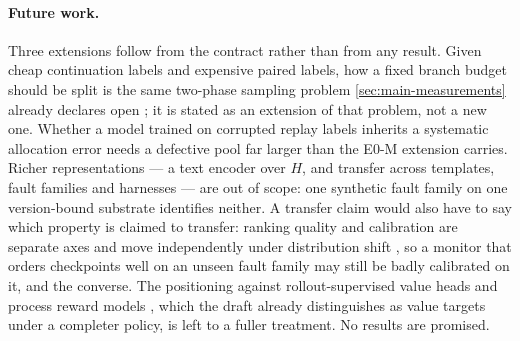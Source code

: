 \paragraph{Future work.}
Three extensions follow from the contract rather than from any result.  Given
cheap continuation labels and expensive paired labels, how a fixed branch budget
should be split is the same two-phase sampling problem
\cref{sec:main-measurements} already declares open
\citep{neyman1938,angelopoulos2023ppi}; it is stated as an extension of that
problem, not a new one.  Whether a model trained on corrupted replay labels
inherits a systematic allocation error needs a defective pool far larger than the
E0-M extension carries.  Richer representations --- a text encoder over $H$, and
transfer across templates, fault families and harnesses --- are out of scope: one
synthetic fault family on one version-bound substrate identifies neither.  A
transfer claim would also have to say which property is claimed to transfer:
ranking quality and calibration are separate axes and move independently under
distribution shift \citep{damani2025rlcr}, so a monitor that orders checkpoints
well on an unseen fault family may still be badly calibrated on it, and the
converse.  The positioning against rollout-supervised value heads and process
reward models \citep{mathshepherd2024,agentprm_choudhury2025,agentprm_xi2025},
which the draft already distinguishes as value targets under a completer policy,
is left to a fuller treatment.  No results are promised.
